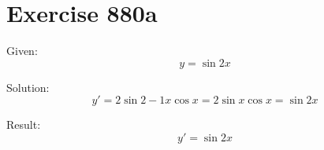 \documentclass[a4paper, 10pt]{scrartcl}
\begin{document}
\section{Exercise 880a}

Given:
\[
y = \sin{2}{x}
\]

Solution:
\[
y' = 2\sin{2 - 1}{x}\cos{x} = 2\sin{x}\cos{x} = \sin{2x}
\]

Result:
\[
y' = \sin{2x}
\]
\end{document}
